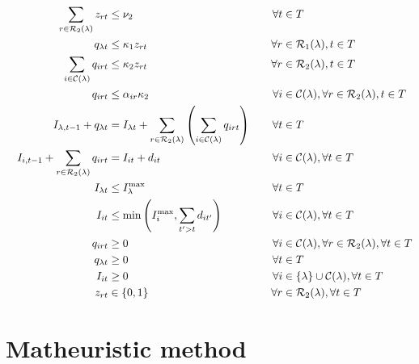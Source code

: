 \documentclass[a4paper,10pt]{article}
\begin{document}
\begin{linenumbers}
\begin{alignat}{3}
    &&\sum_{r\in \mathcal{R}_2(\lambda)} z_{rt} &\leq 	\nu_2													&\forall t&\in T  \label{const:decomp_fleetcapa}\\
    &&q_{\lambda t}   		&\leq \kappa_1 z_{rt} 														&\forall r&\in \mathcal{R}_1(\lambda), t\in T\label{const:decomp_deliveryDCUB}\\
    &&\sum_{i\in \mathcal{C}(\lambda)} q_{irt}   		&\leq \kappa_2 z_{rt} 														&\forall r&\in \mathcal{R}_2(\lambda), t\in T\label{const:decomp_deliveryUB}\\
    &&q_{irt}   		&\leq \alpha_{ir}\kappa_2  														&\forall i&\in\mathcal{C}(\lambda), \forall r\in \mathcal{R}_2(\lambda), t\in T\label{const:decomp_deliveryConstLoc}\\
    &&I_{\lambda,t-1} + q_{\lambda t}   			&=I_{\lambda t} +\sum_{r\in \mathcal{R}_2(\lambda)}\left( \sum_{i\in \mathcal{C}(\lambda)}q_{irt}\right)\quad 			&\forall t& \in T \label{const:decomp_invflowdepots}\\
    &&I_{i,t-1}+\sum_{r\in \mathcal{R}_2(\lambda)} q_{irt} &= I_{it} +d_{it} 							&\forall i&\in \mathcal{C}(\lambda), \forall t\in T\label{const:decomp_dinvflowcustomers}\\
    &&I_{\lambda t}					&\leq I_\lambda^{\max}  									&\forall t&\in T\label{const:decomp_invdepotUB}\\	
    &&I_{it} 					&\leq \min\left(I_i^{\max}, \sum_{t' > t}d_{it'}\right)											&\forall i&\in \mathcal{C}(\lambda), \forall t\in T\label{const:decomp_invcustUB}\\
    &&q_{irt}			&\geq 0 															&\forall i&\in \mathcal{C}(\lambda), \forall r\in \mathcal{R}_2(\lambda),\forall t \in T\label{const:decomp_qpos}	\\
    &&q_{\lambda t}			&\geq 0 															&\forall t&\in T\label{const:decomp_qdcpos}	\\
    &&I_{it}			&\geq 0 															&\forall i &\in \{\lambda\}\cup \mathcal{C}(\lambda), \forall t\in T\label{const:decomp_invCpos}	\\
    &&z_{rt}					&\in \{0,1\} 														&\forall r&\in \mathcal{R}_2(\lambda), \forall t\in T\label{const:decomp_zbool}
\end{alignat}

\section{Matheuristic method} 
\label{sec:algo}


\end{linenumbers}
\end{document}

